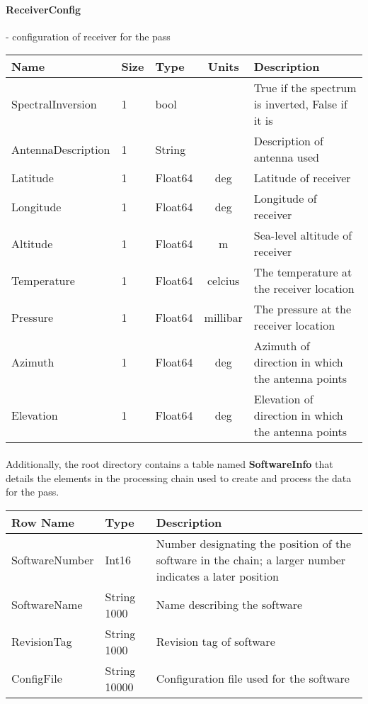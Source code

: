 \documentclass[12pt]{article}
\begin{document}
\begin{small}
\paragraph{ReceiverConfig}- configuration of receiver for the pass\\
\begin{scriptsize}
\begin{tabular}{|l|l|l|c|p{7cm}|}
\hline
\textbf{Name} & \textbf{Size} & \textbf{Type} & \textbf{Units} & \textbf{Description} \\
\hline
SpectralInversion & 1 & bool && True if the spectrum is inverted, False if it is\\
AntennaDescription & 1 & String & & Description of antenna used\\
Latitude & 1 & Float64 & deg & Latitude of receiver\\
Longitude & 1 & Float64 & deg & Longitude of receiver\\
Altitude & 1 & Float64 & m & Sea-level altitude of receiver\\
Temperature & 1 & Float64 & celcius & The temperature at the receiver location\\
Pressure & 1 & Float64 & millibar & The pressure at the receiver location\\
Azimuth & 1 & Float64 & deg & Azimuth of direction in which the antenna points\\
Elevation & 1 & Float64 & deg & Elevation of direction in which the antenna points\\
\hline
\end{tabular}
\end{scriptsize}

\paragraph{} Additionally, the root directory contains a table named \textbf{SoftwareInfo} that details the elements in the processing chain used to create and process the data for the pass.\\
\begin{scriptsize}
\begin{tabular}{|l|l|p{7cm}|}
\hline
\textbf{Row Name} & \textbf{Type} & \textbf{Description} \\
\hline
SoftwareNumber & Int16 & Number designating the position of the software in the chain; a larger number indicates a later position\\
SoftwareName & String 1000 & Name describing the software\\
RevisionTag & String 1000 & Revision tag of software\\
ConfigFile & String 10000 & Configuration file used for the software\\
\hline
\end{tabular}
\end{scriptsize}
\end{small}
\end{document}
